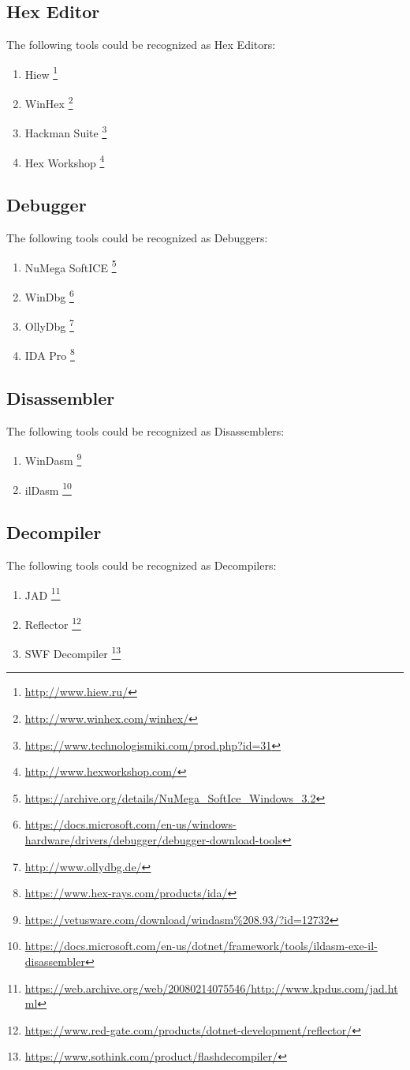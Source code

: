\documentclass[twocolumn]{article}
\begin{document}
\subsection{Hex Editor}
The following tools could be recognized as Hex Editors:
\begin{enumerate}
	\item Hiew \footnote{\url{http://www.hiew.ru/}}
	\item WinHex \footnote{\url{http://www.winhex.com/winhex/}}
	\item Hackman Suite \footnote{\url{https://www.technologismiki.com/prod.php?id=31}}
	\item Hex Workshop \footnote{\url{http://www.hexworkshop.com/}}
\end{enumerate}

\subsection{Debugger}
The following tools could be recognized as Debuggers:
\begin{enumerate}
	\item NuMega SoftICE \footnote{\url{https://archive.org/details/NuMega_SoftIce_Windows_3.2}}
	\item WinDbg \footnote{\url{https://docs.microsoft.com/en-us/windows-hardware/drivers/debugger/debugger-download-tools}}
	\item OllyDbg \footnote{\url{http://www.ollydbg.de/}}
	\item IDA Pro \footnote{\url{https://www.hex-rays.com/products/ida/}}
\end{enumerate}

\subsection{Disassembler}
The following tools could be recognized as Disassemblers:
\begin{enumerate}
	\item WinDasm \footnote{\url{https://vetusware.com/download/windasm\%208.93/?id=12732}}
	\item ilDasm \footnote{\url{https://docs.microsoft.com/en-us/dotnet/framework/tools/ildasm-exe-il-disassembler}}
\end{enumerate}

\subsection{Decompiler}
The following tools could be recognized as Decompilers:
\begin{enumerate}
	\item JAD \footnote{\url{https://web.archive.org/web/20080214075546/http://www.kpdus.com/jad.html}}
	\item Reflector \footnote{\url{https://www.red-gate.com/products/dotnet-development/reflector/}}
	\item SWF Decompiler \footnote{\url{https://www.sothink.com/product/flashdecompiler/}}
\end{enumerate}
\end{document}
